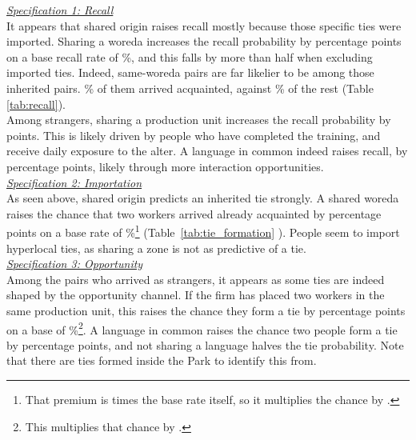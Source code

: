 
\noindent \underline{\textit{Specification 1: Recall}} \\[0.4em]
It appears that shared origin raises recall mostly because those specific ties were imported. Sharing a woreda increases the recall probability by \pnChanRecallOriginPp{} percentage points on a base recall rate of \pnChanRecallBasePct{}\%, and this falls by more than half when excluding imported ties. Indeed, same-woreda pairs are far likelier to be among those \pnChanRecallPreTied{} inherited pairs. \pnChanRecallPreWoredaPct{}\% of them arrived acquainted, against \pnChanRecallPreOtherPct{}\% of the rest (Table \ref{tab:recall}). \\[-0.6em]

\noindent Among strangers, sharing a production unit increases the recall probability by \pnChanRecallUnitStrPp{} points. This is likely driven by people who have completed the training, and receive daily exposure to the alter. A language in common indeed raises recall, by \pnChanRecallLangStrGain{} percentage points, likely through more interaction opportunities. \\

\noindent \underline{\textit{Specification 2: Importation}} \\[0.4em]
As seen above, shared origin predicts an inherited tie strongly. A shared woreda raises the chance that two workers arrived already acquainted by \pnChanImportOriginPp{} percentage points on a base rate of \pnChanImportBasePct{}\%\footnote{That premium is \pnChanImportMult{} times the base rate itself, so it multiplies the chance by \pnChanImportOriginRel{}.} (Table~\ref{tab:tie_formation} ). People seem to import hyperlocal ties, as sharing a zone is not as predictive of a tie. \\

\noindent \underline{\textit{Specification 3: Opportunity}} \\[0.4em]
Among the \pnChanNewN{} pairs who arrived as strangers, it appears as some ties are indeed shaped by the opportunity channel. If the firm has placed two workers in the same production unit, this raises the chance they form a tie by \pnChanOppUnitPp{} percentage points on a base of \pnChanOppBasePct{}\%\footnote{This multiplies that chance by \pnChanOppUnitRel{}.}. A language in common raises the chance two people form a tie by \pnChanOppLangGain{} percentage points, and not sharing a language halves the tie probability. Note that there are \pnChanOppTies{} ties formed inside the Park to identify this from. \\

